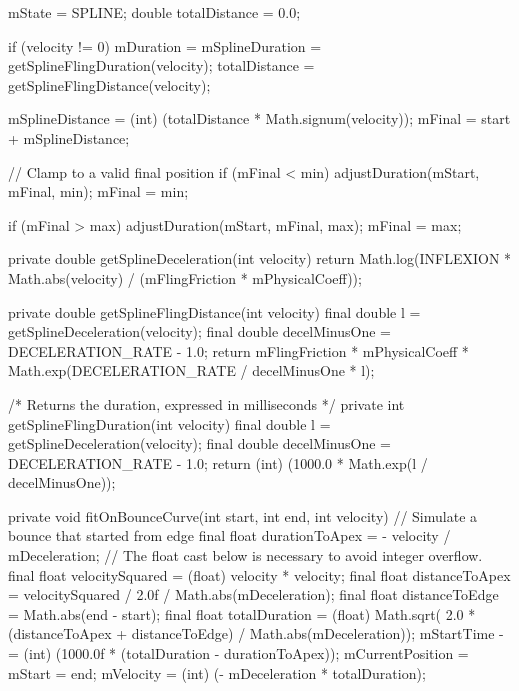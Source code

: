 {{{            mState = SPLINE;
            double totalDistance = 0.0;

            if (velocity != 0) {
                mDuration = mSplineDuration = getSplineFlingDuration(velocity);
                totalDistance = getSplineFlingDistance(velocity);
            }

            mSplineDistance = (int) (totalDistance * Math.signum(velocity));
            mFinal = start + mSplineDistance;

            // Clamp to a valid final position
            if (mFinal < min) {
                adjustDuration(mStart, mFinal, min);
                mFinal = min;
            }

            if (mFinal > max) {
                adjustDuration(mStart, mFinal, max);
                mFinal = max;
            }
        }

        private double getSplineDeceleration(int velocity) {
            return Math.log(INFLEXION * Math.abs(velocity) / (mFlingFriction * mPhysicalCoeff));
        }

        private double getSplineFlingDistance(int velocity) {
            final double l = getSplineDeceleration(velocity);
            final double decelMinusOne = DECELERATION_RATE - 1.0;
            return mFlingFriction * mPhysicalCoeff * Math.exp(DECELERATION_RATE / decelMinusOne * l);
        }

        /* Returns the duration, expressed in milliseconds */
        private int getSplineFlingDuration(int velocity) {
            final double l = getSplineDeceleration(velocity);
            final double decelMinusOne = DECELERATION_RATE - 1.0;
            return (int) (1000.0 * Math.exp(l / decelMinusOne));
        }

        private void fitOnBounceCurve(int start, int end, int velocity) {
            // Simulate a bounce that started from edge
            final float durationToApex = - velocity / mDeceleration;
            // The float cast below is necessary to avoid integer overflow.
            final float velocitySquared = (float) velocity * velocity;
            final float distanceToApex = velocitySquared / 2.0f / Math.abs(mDeceleration);
            final float distanceToEdge = Math.abs(end - start);
            final float totalDuration = (float) Math.sqrt(
                    2.0 * (distanceToApex + distanceToEdge) / Math.abs(mDeceleration));
            mStartTime -= (int) (1000.0f * (totalDuration - durationToApex));
            mCurrentPosition = mStart = end;
            mVelocity = (int) (- mDeceleration * totalDuration);
        }

}}
